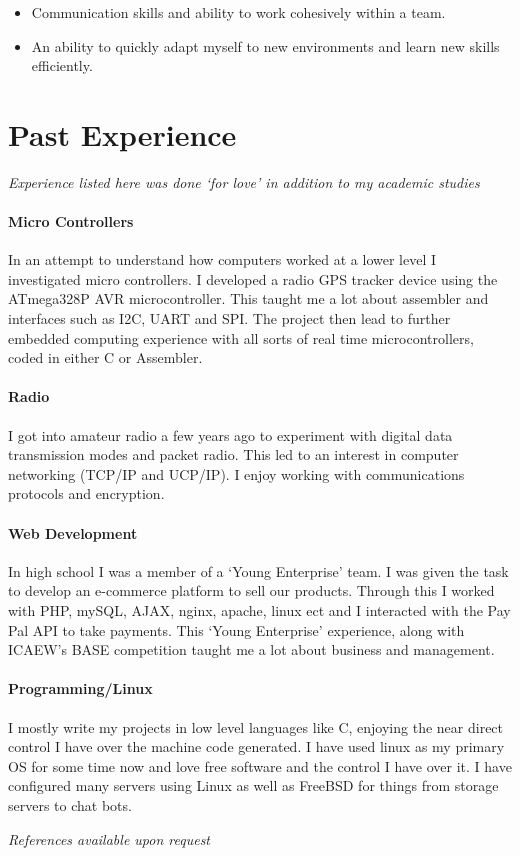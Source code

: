\documentclass[9pt,a4paper]{article}
\begin{document}
\begin{multicols*}{2}
\begin{itemize}
\item Communication skills and ability to work cohesively within a team.

\item An ability to quickly adapt myself to new environments and learn new skills efficiently.
\end{itemize}

\section*{Past Experience}
\textit{Experience listed here was done `for love' in addition to my academic studies}

\paragraph{Micro Controllers} In an attempt to understand how computers worked at a lower level I investigated micro controllers.
I developed a radio GPS tracker device using the ATmega328P AVR microcontroller.
This taught me a lot about assembler and interfaces such as I2C, UART and SPI.
The project then lead to further embedded computing experience with all sorts of real time microcontrollers, coded in either C or Assembler.
\vspace*{-0.5cm}
\paragraph{Radio} I got into amateur radio a few years ago to experiment with digital data transmission modes and packet radio.
This led to an interest in computer networking (TCP/IP and UCP/IP).
I enjoy working with communications protocols and encryption.
\vspace*{-0.5cm}
\paragraph{Web Development} In high school I was a member of a `Young Enterprise' team.
I was given the task to develop an e-commerce platform to sell our products.
Through this I worked with PHP, mySQL, AJAX, nginx, apache, linux ect
and I interacted with the Pay Pal API to take payments.
This `Young Enterprise' experience, along with ICAEW's BASE competition taught me a lot about business and management.
\vspace*{-0.5cm}
\paragraph{Programming/Linux} 
I mostly write my projects in low level languages like C, enjoying the near direct control I have over the machine code generated.
I have used linux as my primary OS for some time now and love free software and the control I have over it.
I have configured many servers using Linux as well as FreeBSD for things from storage servers to chat bots.

\vfill
\textit{References available upon request}
\end{multicols*}
\end{document}
